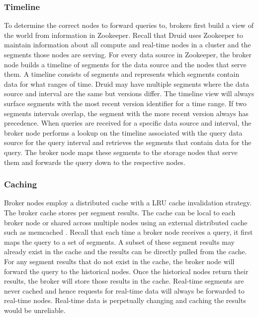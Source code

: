 \documentclass{vldb}
\begin{document}
\subsubsection{Timeline}
To determine the correct nodes to forward queries to, brokers
first build a view of the world from information in Zookeeper. Recall
that Druid uses Zookeeper to maintain information about all compute
and real-time nodes in a cluster and the segments those nodes are
serving. For every data source in Zookeeper, the broker node builds a
timeline of segments for the data source and the nodes that serve them. A timeline
consists of segments and represents which segments contain data for
what ranges of time. Druid may have multiple segments where the data
source and interval are the same but versions differ. The timeline
view will always surface segments with the most recent version
identifier for a time range. If two segments intervals overlap, the segment with the more recent
version always has precedence. When queries are received for a specific
data source and interval, the broker node performs a lookup on the
timeline associated with the query data source for the query interval
and retrieves the segments that contain data for the query. The broker
node maps these segments to the storage nodes that serve them and
forwards the query down to the respective nodes.


\subsubsection{Caching}
\label{sec:caching}
Broker nodes employ a distributed cache with a LRU \cite{o1993lru,
kim2001lrfu} cache invalidation strategy. The broker cache stores
per segment results. The cache can be local to each broker node or
shared across multiple nodes using an external distributed cache
such as memcached \cite{fitzpatrick2004distributed}. Recall that each time a broker node receives a
query, it first maps the query to a set of segments. A subset of
these segment results may already exist in the cache and the results
can be directly pulled from the cache. For any segment results that
do not exist in the cache, the broker node will forward the query
to the historical nodes. Once the historical nodes return their results,
the broker will store those results in the cache. Real-time segments
are never cached and hence requests for real-time data will always
be forwarded to real-time nodes. Real-time data is perpetually
changing and caching the results would be unreliable.
\end{document}
